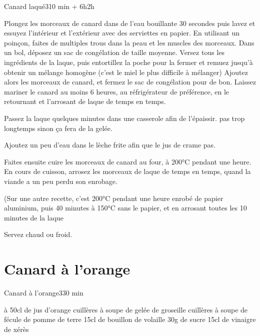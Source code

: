 {\begin{recette}{Canard laqué}{3}{10 min + 6h}{2h}
\begin{preparation}
\etape Plongez les morceaux de canard dans de l'eau bouillante 30 secondes puis lavez et essuyez l'intérieur et l'extérieur avec 
des serviettes en papier.
\etape En utilisant un poinçon, faites de multiples trous dans la peau et les muscles des morceaux.
\etape Dans un bol, déposez un sac de congélation de taille moyenne. Versez tous les ingrédients de la laque, puis entortillez 
la poche pour la fermer et remuez jusqu'à obtenir un mélange homogène (c'est le miel le plus difficile à mélanger)
\etape Ajoutez alors les morceaux de canard, et fermez le sac de congélation pour de bon.
\etape Laissez mariner le canard au moins 6 heures, au réfrigérateur de préférence, en le retournant et l'arrosant de laque de 
temps en temps.
\end{preparation}

\begin{cuisson}
Passez la laque quelques minutes dans une casserole afin de l'épaissir. pas trop longtemps sinon ça fera de la gelée. 

Ajoutez un peu d'eau dans le lèche frite afin que le jus de crame pas. 

Faites ensuite cuire les morceaux de canard au four, à 200°C pendant une heure. En cours de cuisson, arrosez les morceaux de 
laque de temps en temps, quand la viande a un peu perdu son enrobage. 

(Sur une autre recette, c'est 200°C pendant une heure enrobé de papier aluminium, puis 40 minutes à 150°C sans le papier, et en arrosant toutes les 10 minutes de la laque

Servez chaud ou froid.
\end{cuisson}
\end{recette}

\section{Canard à l'orange}
\begin{recette}{Canard à l'orange}{3}{30 min}{}

\begin{ingredients}
 à 50cl de jus d'orange
 cuillères à soupe de gelée de groseille
 cuillères à soupe de fécule de pomme de terre
\ingredient 15cl de bouillon de volaille
\ingredient 30g de sucre
\ingredient 15cl de vinaigre de xérès
\end{ingredients}


\end{recette}}
